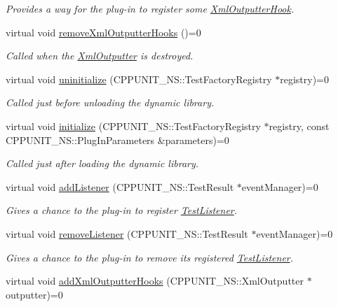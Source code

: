 \begin{DoxyCompactItemize}
\begin{DoxyCompactList}\small\item\em Provides a way for the plug-\/in to register some \hyperlink{class_xml_outputter_hook}{Xml\+Outputter\+Hook}. \end{DoxyCompactList}\item 
virtual void \hyperlink{struct_cpp_unit_test_plug_in_a045727ad9658525838b0b9157065fbcd}{remove\+Xml\+Outputter\+Hooks} ()=0
\begin{DoxyCompactList}\small\item\em Called when the \hyperlink{class_xml_outputter}{Xml\+Outputter} is destroyed. \end{DoxyCompactList}\item 
virtual void \hyperlink{struct_cpp_unit_test_plug_in_a8628d2026e76c58f715e17af88f77458}{uninitialize} (C\+P\+P\+U\+N\+I\+T\+\_\+\+N\+S\+::\+Test\+Factory\+Registry $\ast$registry)=0
\begin{DoxyCompactList}\small\item\em Called just before unloading the dynamic library. \end{DoxyCompactList}\item 
virtual void \hyperlink{struct_cpp_unit_test_plug_in_aec670330e7fced26c2a66b1dcd56edc0}{initialize} (C\+P\+P\+U\+N\+I\+T\+\_\+\+N\+S\+::\+Test\+Factory\+Registry $\ast$registry, const C\+P\+P\+U\+N\+I\+T\+\_\+\+N\+S\+::\+Plug\+In\+Parameters \&parameters)=0
\begin{DoxyCompactList}\small\item\em Called just after loading the dynamic library. \end{DoxyCompactList}\item 
virtual void \hyperlink{struct_cpp_unit_test_plug_in_aad8038dc72d0f9798379937fe5692c97}{add\+Listener} (C\+P\+P\+U\+N\+I\+T\+\_\+\+N\+S\+::\+Test\+Result $\ast$event\+Manager)=0
\begin{DoxyCompactList}\small\item\em Gives a chance to the plug-\/in to register \hyperlink{class_test_listener}{Test\+Listener}. \end{DoxyCompactList}\item 
virtual void \hyperlink{struct_cpp_unit_test_plug_in_a8f36157014b515d38efbc8ab67923d85}{remove\+Listener} (C\+P\+P\+U\+N\+I\+T\+\_\+\+N\+S\+::\+Test\+Result $\ast$event\+Manager)=0
\begin{DoxyCompactList}\small\item\em Gives a chance to the plug-\/in to remove its registered \hyperlink{class_test_listener}{Test\+Listener}. \end{DoxyCompactList}\item 
\hypertarget{struct_cpp_unit_test_plug_in_a547cfddd0513dc9182721f723e27d9e3}{virtual void \hyperlink{struct_cpp_unit_test_plug_in_a547cfddd0513dc9182721f723e27d9e3}{add\+Xml\+Outputter\+Hooks} (C\+P\+P\+U\+N\+I\+T\+\_\+\+N\+S\+::\+Xml\+Outputter $\ast$outputter)=0}\label{struct_cpp_unit_test_plug_in_a547cfddd0513dc9182721f723e27d9e3}


\end{DoxyCompactItemize}
